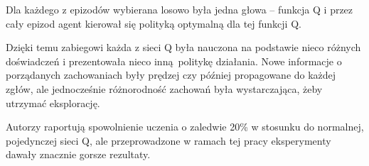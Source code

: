 Dla każdego z epizodów wybierana losowo była jedna głowa – funkcja Q i przez cały epizod agent kierował się polityką optymalną dla tej funkcji Q.

Dzięki temu zabiegowi każda z sieci Q była nauczona na podstawie nieco różnych doświadczeń i prezentowała nieco inną politykę działania. Nowe informacje o porządanych zachowaniach były prędzej czy później propagowane do każdej zgłów, ale jednocześnie różnorodność zachowań była wystarczająca, żeby utrzymać eksplorację.

Autorzy raportują spowolnienie uczenia o zaledwie 20\% w stosunku do normalnej, pojedynczej sieci Q, ale przeprowadzone w ramach tej pracy eksperymenty dawały znacznie gorsze rezultaty.
